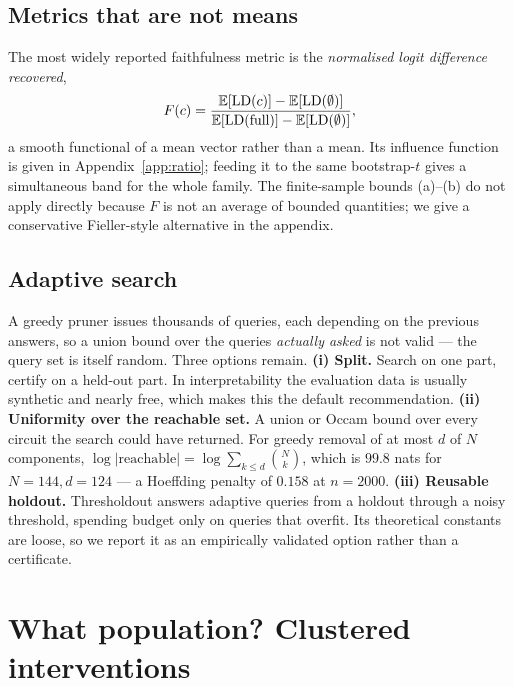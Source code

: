 \subsection{Metrics that are not means}
\label{sec:ratio}

The most widely reported faithfulness metric is the \emph{normalised logit
difference recovered},
\[
F(c)=\frac{\mathbb{E}[\mathrm{LD}(c)]-\mathbb{E}[\mathrm{LD}(\emptyset)]}{\mathbb{E}[\mathrm{LD}(\text{full})]-\mathbb{E}[\mathrm{LD}(\emptyset)]},
\]
a smooth functional of a mean vector rather than a mean. Its influence function
is given in Appendix~\ref{app:ratio}; feeding it to the same bootstrap-$t$
gives a simultaneous band for the whole family. The finite-sample bounds (a)--(b)
do not apply directly because $F$ is not an average of bounded quantities; we
give a conservative Fieller-style alternative in the appendix.

\subsection{Adaptive search}
\label{sec:adaptive}

A greedy pruner issues thousands of queries, each depending on the previous
answers, so a union bound over the queries \emph{actually asked} is not valid ---
the query set is itself random. Three options remain.
\textbf{(i) Split.} Search on one part, certify on a held-out part. In
interpretability the evaluation data is usually synthetic and nearly free, which
makes this the default recommendation.
\textbf{(ii) Uniformity over the reachable set.} A union or Occam bound over
every circuit the search could have returned. For greedy removal of at most $d$
of $N$ components, $\log|\text{reachable}|=\log\sum_{k\le d}\binom{N}{k}$, which
is $99.8$ nats for $N=144,d=124$ --- a Hoeffding penalty of $0.158$ at $n=2000$.
\textbf{(iii) Reusable holdout.} Thresholdout \citep{dwork2015reusable} answers
adaptive queries from a holdout through a noisy threshold, spending budget only
on queries that overfit. Its theoretical constants are loose, so we report it as
an empirically validated option rather than a certificate.

\section{What population? Clustered interventions}
\label{sec:cluster}

